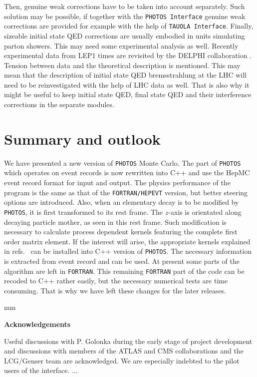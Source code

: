 \documentclass[]{Photos_interface_design}
\begin{document}
Then, genuine weak corrections have to be taken into account separately.
Such solution may be possible,  if together with the {\tt PHOTOS Interface}
genuine weak corrections are provided for example with the help of  {\tt TAUOLA Interface}.
Finally, sizeable initial state QED corrections are usually embodied in  units 
simulating parton showers. This may need some experimental analysis as well. 
Recently experimental data from LEP1 times are revisited by the DELPHI collaboration \cite{Abdallah:2010tk}.
Tension between data and the theoretical description is 
mentioned. This may mean that the description of initial state QED bremsstrahlung 
at the LHC will need to be reinvestigated with the help of LHC data as well.
That is also why it  might be useful to keep initial state QED, final state QED and their interference corrections in the separate modules.

\section{Summary and outlook}
\label{sec:summary}
We have presented a new version  of {\tt PHOTOS} Monte Carlo. The part of 
{\tt PHOTOS} which operates on 
event records is now rewritten into C++ and use the HepMC event record 
format for input and output. The physics performance of the program is the
same as that of the {\tt FORTRAN/HEPEVT} version, but better steering options are introduced. 
Also, when an elementary decay is to be modified by {\tt PHOTOS}, 
it is first transformed to its rest frame. The $z$-axis is orientated along decaying particle mother, as seen in this rest  frame. Such modification is 
necessary to calculate process dependent kernels
featuring the complete first order matrix element. If the interest will arise,
the appropriate kernels explained in
refs.~\cite{Golonka:2006tw,Nanava:2006vv,Nanava:2009vg} can be installed
into  C++ version of {\tt PHOTOS}. The necessary information is extracted
from event record and can be used.
At present some parts of the algorithm are left in {\tt FORTRAN}.
 This remaining {\tt FORTRAN} part of the code 
can be recoded to C++ rather easily, but the necessary numerical tests 
are time consuming. That is why we have left these changes for the later 
releases. 


 mm

\centerline{\large\bf Acknowledgements}


Useful discussions with P. Golonka during the early stage of project development and discussions 
with members of the ATLAS and CMS collaborations and the LCG/Genser team 
are acknowledged.
We are especially indebted to the pilot users of the interface.
...
\end{document}
